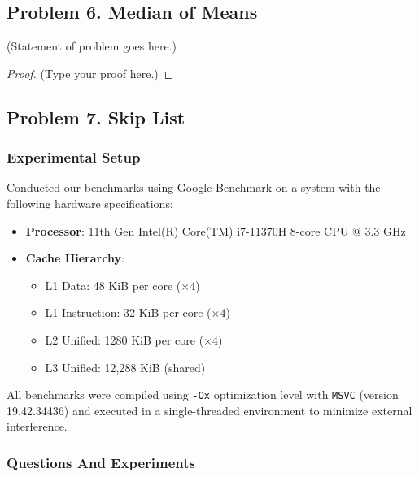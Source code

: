\documentclass[12pt]{article}
\begin{document}
	\vspace{2in} %
	
	
	\subsection*{Problem 6. Median of Means}
	(Statement of problem goes here.)\\
	
	\begin{proof}
		(Type your proof here.)
	\end{proof}
	
	\vspace{2in} %
	
	
	\subsection*{Problem 7. Skip List}
	\vspace{20pt}
	\subsubsection*{Experimental Setup}
	Conducted our benchmarks using Google Benchmark on a system with the following hardware specifications:

\begin{itemize}
    \item \textbf{Processor}: 11th Gen Intel(R) Core(TM) i7-11370H 8-core CPU @ 3.3 GHz
    \item \textbf{Cache Hierarchy}:
    \begin{itemize}
        \item L1 Data: 48 KiB per core (\(\times 4\))
        \item L1 Instruction: 32 KiB per core (\(\times 4\))
        \item L2 Unified: 1280 KiB per core (\(\times 4\))
        \item L3 Unified: 12,288 KiB (shared)
    \end{itemize}
\end{itemize}

All benchmarks were compiled using \texttt{-Ox} optimization level with \texttt{MSVC} (version 19.42.34436) and executed in a single-threaded environment to minimize external interference.

\subsubsection*{Questions And Experiments}
	
\end{document}

